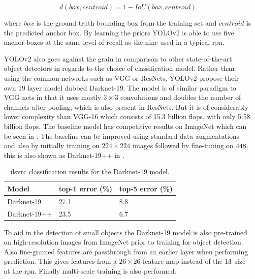 \begin{equation}
  d(box, centroid) = 1 - IoU(box, centroid)
\end{equation}

where $box$ is the ground truth bounding box from the training set and $centroid$ is the predicted anchor box. By learning the priors YOLOv2 is able to use five anchor boxes at the same level of recall as the nine used in a typical \gls{rpn}.

YOLOv2 also goes against the grain in comparison to other state-of-the-art object detectors in regards to the choice of classification model. Rather than using the common networks such as VGG or ResNets, YOLOv2 propose their own 19 layer model dubbed Darknet-19. The model is of similar paradigm to VGG nets in that it uses mostly $3 \times 3$ convolutions and doubles the number of channels after pooling, which is also present in ResNets. But it is of considerably lower complexity than VGG-16 which consists of 15.3 billion \gls{flops}, with only 5.58 billion \gls{flops}. The baseline model has competitive results on ImageNet which can be seen in . The baseline can be improved using standard data augmentations and also by initially training on $224 \times 224$ images followed by fine-tuning on $448 \time 448$, this is also shown as Darknet-19++ in .

\begin{table}[h]
\centering
\caption{\gls{ilsvrc} classification results for the Darknet-19 model.}
\label{tab:darknetimagenet}
\begin{tabular}{|l|l|l|}
\hline
Model                                                                                       & top-1 error (\%) & top-5 error (\%) \\ \hline
Darknet-19                                                                                  & 27.1             & 8.8              \\ \hline
Darknet-19++ & 23.5             & 6.7              \\ \hline
\end{tabular}
\end{table}

To aid in the detection of small objects the Darknet-19 model is also pre-trained on high-resolution images from ImageNet prior to training for object detection. Also fine-grained features are passthrough from an earlier layer when performing prediction. This gives features from a $26 \times 26$ feature map instead of the $13 \time 13$ size at the \gls{rpn}. Finally multi-scale training is also performed.

